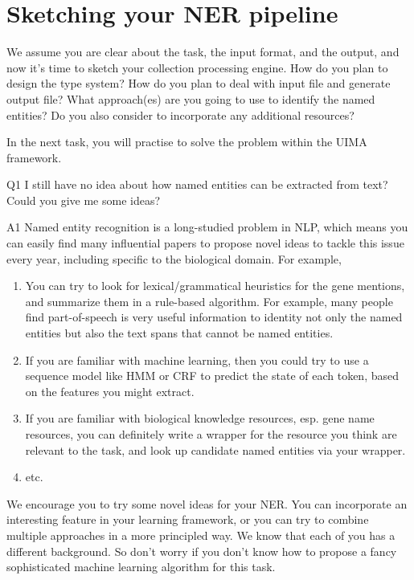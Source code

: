 
\section{Sketching your NER pipeline}

We assume you are clear about the task, the input format, and the output, and
now it's time to sketch your collection processing engine. How do you plan to
design the type system? How do you plan to deal with input file and generate
output file? What approach(es) are you going to use to identify the named
entities? Do you also consider to incorporate any additional resources?

In the next task, you will practise to solve the problem within the UIMA
framework.

\begin{qa}

\item[Q1] I still have no idea about how named entities can be extracted from
text? Could you give me some ideas?

\item[A1] Named entity recognition is a long-studied problem in NLP, which means
you can easily find many influential papers to propose novel ideas to tackle
this issue every year, including specific to the biological domain. For example,

\begin{enumerate}
\item You can try to look for lexical/grammatical heuristics for the gene
mentions, and summarize them in a rule-based algorithm. For example, many people
find part-of-speech is very useful information to identity not only the named
entities but also the text spans that cannot be named entities.
\item If you are familiar with machine learning, then you could try to use a
sequence model like HMM or CRF to predict the state of each token, based on the
features you might extract.
\item If you are familiar with biological knowledge resources, esp. gene name
resources, you can definitely write a wrapper for the resource you think are
relevant to the task, and look up candidate named entities via your wrapper.
\item etc.
\end{enumerate}

We encourage you to try some novel ideas for your NER. You can incorporate an
interesting feature in your learning framework, or you can try to combine
multiple approaches in a more principled way. We know that each of you has a
different background. So don't worry if you don't know how to propose a fancy
sophisticated machine learning algorithm for this task.


\end{qa}
